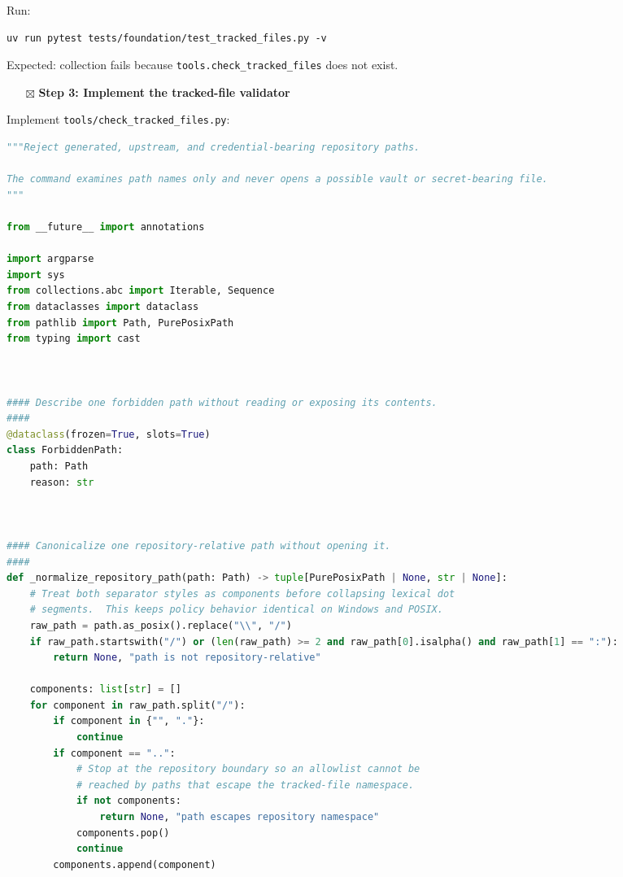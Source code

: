 \documentclass[
  letterpaper,
]{article}
\providecommand{\tightlist}{%
  \setlength{\itemsep}{0pt}\setlength{\parskip}{0pt}}
\begin{document}
Run:

\begin{lstlisting}
uv run pytest tests/foundation/test_tracked_files.py -v
\end{lstlisting}

Expected: collection fails because \nolinkurl{tools.check_tracked_files} does not exist.

\begin{itemize}
\tightlist
\item[$\boxtimes$]
  \textbf{Step 3: Implement the tracked-file validator}
\end{itemize}

Implement \nolinkurl{tools/check_tracked_files.py}:

\begin{lstlisting}[language=Python]
"""Reject generated, upstream, and credential-bearing repository paths.

The command examines path names only and never opens a possible vault or secret-bearing file.
"""

from __future__ import annotations

import argparse
import sys
from collections.abc import Iterable, Sequence
from dataclasses import dataclass
from pathlib import Path, PurePosixPath
from typing import cast



#### Describe one forbidden path without reading or exposing its contents.
####
@dataclass(frozen=True, slots=True)
class ForbiddenPath:
    path: Path
    reason: str



#### Canonicalize one repository-relative path without opening it.
####
def _normalize_repository_path(path: Path) -> tuple[PurePosixPath | None, str | None]:
    # Treat both separator styles as components before collapsing lexical dot
    # segments.  This keeps policy behavior identical on Windows and POSIX.
    raw_path = path.as_posix().replace("\\", "/")
    if raw_path.startswith("/") or (len(raw_path) >= 2 and raw_path[0].isalpha() and raw_path[1] == ":"):
        return None, "path is not repository-relative"

    components: list[str] = []
    for component in raw_path.split("/"):
        if component in {"", "."}:
            continue
        if component == "..":
            # Stop at the repository boundary so an allowlist cannot be
            # reached by paths that escape the tracked-file namespace.
            if not components:
                return None, "path escapes repository namespace"
            components.pop()
            continue
        components.append(component)


\end{lstlisting}
\end{document}
